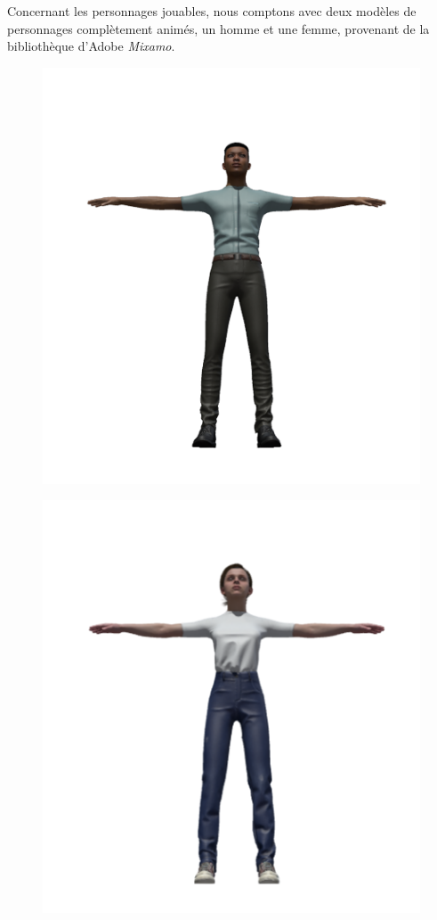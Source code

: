 Concernant les personnages jouables, nous comptons avec deux modèles de personnages complètement animés, un homme et une femme, provenant de la bibliothèque d’Adobe \emph{Mixamo}.
\newline

\begin{figure}[H]
\centering
\begin{minipage}{.5\textwidth}
  \centering
  \includegraphics[width=.6\linewidth]{img/assets/remi.png}
  \label{fig:rémi}
\end{minipage}%
\begin{minipage}{.5\textwidth}
  \centering
  \includegraphics[width=.6\linewidth]{img/assets/sonia.png}
  \label{fig:sonia}
\end{minipage}
\end{figure}

